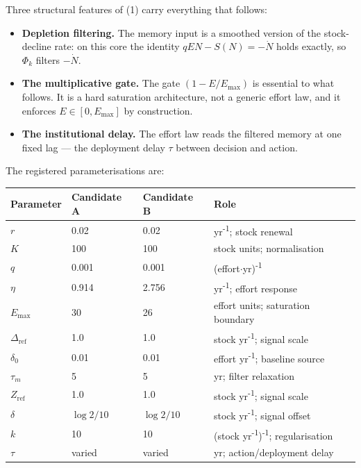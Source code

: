 \documentclass[11pt]{article}
\providecommand{\tightlist}{\setlength{\itemsep}{0pt}\setlength{\parskip}{0pt}}
\begin{document}
Three structural features of (1) carry everything that follows:

\begin{itemize}
\tightlist
\item
  \textbf{Depletion filtering.} The memory input is a smoothed version
  of the stock-decline rate: on this core the identity
  \(qEN - S(N) = -\dot N\) holds exactly, so \(\Phi_k\) filters
  \(-\dot N\).
\item
  \textbf{The multiplicative gate.} The gate \((1 - E/E_{\max})\) is
  essential to what follows. It is a hard saturation architecture, not a
  generic effort law, and it enforces \(E \in [0, E_{\max}]\) by
  construction.
\item
  \textbf{The institutional delay.} The effort law reads the filtered
  memory at one fixed lag --- the deployment delay \(\tau\) between
  decision and action.
\end{itemize}

The registered parameterisations are:

\begin{longtable}[]{@{}llll@{}}
\toprule\noalign{}
Parameter & Candidate A & Candidate B & Role \\
\midrule\noalign{}
\endhead
\bottomrule\noalign{}
\endlastfoot
\(r\) & 0.02 & 0.02 & yr\textsuperscript{-1}; stock renewal \\
\(K\) & 100 & 100 & stock units; normalisation \\
\(q\) & 0.001 & 0.001 & (effort\ensuremath{\cdot}yr)\textsuperscript{-1} \\
\(\eta\) & 0.914 & 2.756 & yr\textsuperscript{-1}; effort response \\
\(E_{\max}\) & 30 & 26 & effort units; saturation boundary \\
\(\Delta_{\mathrm{ref}}\) & 1.0 & 1.0 & stock yr\textsuperscript{-1}; signal scale \\
\(\delta_0\) & 0.01 & 0.01 & effort yr\textsuperscript{-1}; baseline source \\
\(\tau_m\) & 5 & 5 & yr; filter relaxation \\
\(Z_{\mathrm{ref}}\) & 1.0 & 1.0 & stock yr\textsuperscript{-1}; signal scale \\
\(\delta\) & \(\log 2/10\) & \(\log 2/10\) & stock yr\textsuperscript{-1}; signal
offset \\
\(k\) & 10 & 10 & (stock yr\textsuperscript{-1})\textsuperscript{-1}; regularisation \\
\(\tau\) & varied & varied & yr; action/deployment delay \\
\end{longtable}
\end{document}
